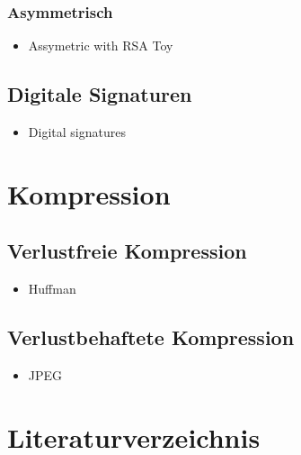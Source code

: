 \documentclass[
  letterpaper,
  DIV=11]{scrreprt}
\providecommand{\tightlist}{%
  \setlength{\itemsep}{0pt}\setlength{\parskip}{0pt}}\usepackage{longtable,booktabs,array}
\begin{document}
\subsection{Asymmetrisch}\label{asymmetrisch}

\begin{itemize}
\tightlist
\item
  Assymetric with RSA Toy
\end{itemize}

\section{Digitale Signaturen}\label{digitale-signaturen}

\begin{itemize}
\tightlist
\item
  Digital signatures
\end{itemize}

\chapter{Kompression}\label{kompression}

\section{Verlustfreie Kompression}\label{verlustfreie-kompression}

\begin{itemize}
\tightlist
\item
  Huffman
\end{itemize}

\section{Verlustbehaftete
Kompression}\label{verlustbehaftete-kompression}

\begin{itemize}
\tightlist
\item
  JPEG
\end{itemize}


\chapter*{Literaturverzeichnis}\label{literaturverzeichnis}

\end{document}
